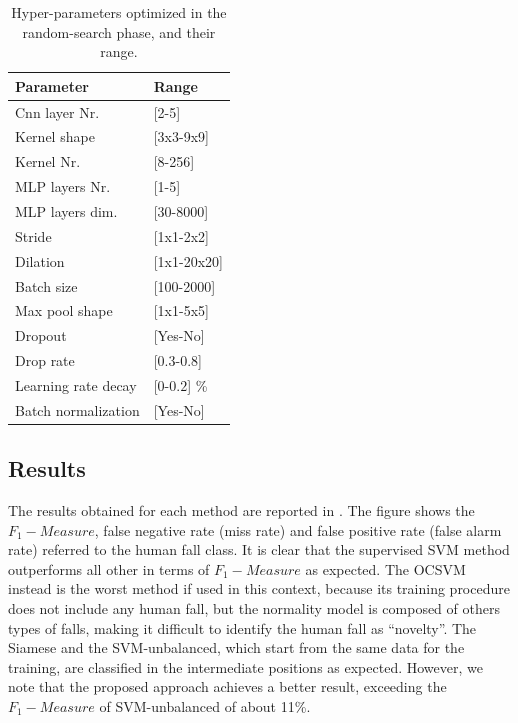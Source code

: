 \begin{table}[htb]
	\caption{Hyper-parameters optimized in the random-search phase, and their range.}\label{tab:random_search_params}
	\centering
	
	\begin{tabular} {|K{4cm}|K{4cm}|}
		\hline
		\textbf{Parameter} 		& \textbf{Range} \\  
		\hline
		Cnn layer Nr. 	& [2-5]		                          \\
		\hline
		Kernel shape 	& [3x3-9x9]  \footnotemark[3]      \\
		\hline									
		Kernel Nr. 		& [8-256]	                            \\
		\hline                      
		MLP layers Nr. 	&	[1-5]	                          \\
		\hline
		MLP layers dim.	&[30-8000]                            \\
		\hline
		Stride & [1x1-2x2]			                          \\
		\hline
		Dilation & [1x1-20x20]\footnotemark[3]   \\
		\hline
		Batch size	&	[100-2000]                                    						\\
		\hline 
		Max pool shape & [1x1-5x5]\footnotemark[3]      \\
		\hline
		Dropout & [Yes-No]                    \\
		\hline
		Drop rate	&	[0.3-0.8]                         \\
		\hline
		Learning rate decay	&	[$0$-$0.2$] \%     \\
		\hline                
		Batch normalization	&	[Yes-No]                    \\
		\hline
		
	\end{tabular}
\end{table}



\subsection{Results}
\label{sec:Results}
The results obtained for each method are reported in . The figure shows the $ F_1 -Measure$, false negative rate (miss rate) and false positive rate (false alarm rate) referred to the human fall class. It is clear that the supervised SVM method outperforms all other in terms of  $ F_1 -Measure$ as expected. The OCSVM instead is the worst method if used in this context, because its training procedure does not include any human fall, but the normality model is composed of others types of falls, making it difficult to identify the human fall as ``novelty''. The Siamese and the SVM-unbalanced, which start from the same data for the training, are classified in the intermediate positions as expected. However, we note that the proposed approach achieves a better result, exceeding the $ F_1 -Measure$ of SVM-unbalanced of about 11\%. 

